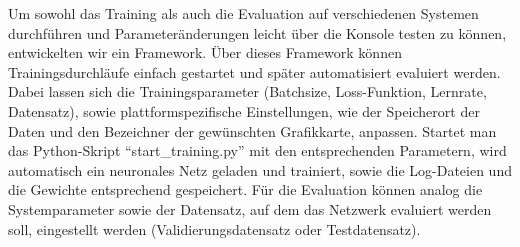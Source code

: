 Um sowohl das Training als auch die Evaluation auf verschiedenen Systemen durchführen und Parameteränderungen leicht über die Konsole testen zu können, entwickelten wir ein Framework. Über dieses Framework können Trainingsdurchläufe einfach gestartet und später automatisiert evaluiert werden. Dabei lassen sich die Trainingsparameter (Batchsize, Loss-Funktion, Lernrate, Datensatz), sowie plattformspezifische Einstellungen, wie der Speicherort der Daten und den Bezeichner der gewünschten Grafikkarte, anpassen. Startet man das Python-Skript ``start\_training.py'' mit den entsprechenden Parametern, wird automatisch ein neuronales Netz geladen und trainiert, sowie die Log-Dateien und die Gewichte entsprechend gespeichert. Für die Evaluation können analog die Systemparameter sowie der Datensatz, auf dem das Netzwerk evaluiert werden soll, eingestellt werden (Validierungsdatensatz oder Testdatensatz).


